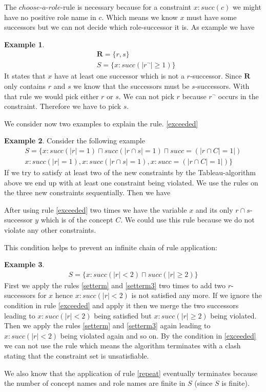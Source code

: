 \documentclass[a4paper,11pt]{scrartcl}
\theoremstyle{break}
\theoremstyle{definition}
\newtheorem{ex}{Example}
\begin{document}
The $choose$-$a$-$role$-rule is necessary because for a constraint $x:succ(c)$ we might have no positive role name in $c$. Which means we know $x$ must have some successors but we can not decide which role-successor it is. As example we have
\begin{ex}
\begin{align*}
&\mathbf{R}=\{r,s\}\\
&S=\{x:succ(|r^\neg|\geq 1)\}
\end{align*}
It states that $x$ have at least one successor which is not a $r$-successor. Since $\mathbf{R}$ only contains $r$ and $s$ we know that the successors must be $s$-successors. With that rule we would pick either $r$ or $s$. We can not pick $r$ because $r^\neg$ occurs in the constraint. Therefore we have to pick $s$.
\end{ex}
We consider now two examples to explain the rule. \ref{exceeded}
\begin{ex}
Consider the following example 
\begin{align*}
S=\{x:succ(|r|=1)\sqcap succ(|r\cap s|=1)\sqcap succ=(|r\cap C|=1|)\\
x:succ(|r|=1), x:succ(|r\cap s|=1), x:succ=(|r\cap C|=1|)
\}
\end{align*}
If we try to satisfy at least two of the new constraints by the Tableau-algorithm above we end up with at least one constraint being violated. We use the rules on the three new constraints sequentially. Then we have 
\begin{figure}[H]
\centering
{}
\end{figure}
After using rule \ref{exceeded} two times we have the variable $x$ and its only $r\cap s$-successor $y$ which is of the concept $C$. We could use this rule because we do not violate any other constraints. 
\end{ex}
This condition helps to prevent an infinite chain of rule application:
\begin{ex}
\begin{align*}
S=\{x:succ(|r|<2)\sqcap succ(|r|\geq 2)\}	
\end{align*}
First we apply the rules \ref{setterm} and \ref{setterm3} two times to add two $r$-successors for $x$ hence $x:succ(|r|<2)$ is not satisfied any more. If we ignore the condition in rule \ref{exceeded} and apply it then we merge the two successors leading to $x:succ(|r|<2)$ being satisfied but $x:succ(|r|\geq 2)$ being violated. Then we apply the rules \ref{setterm} and \ref{setterm3} again leading to $x:succ(|r|<2)$ being violated again and so on. By the condition in \ref{exceeded} we can not use the rule which means the algorithm terminates with a clash stating that the constraint set is unsatisfiable.
\end{ex}
We also know that the application of rule \ref{repeat} eventually terminates because the number of concept names and role names are finite in $S$ (since $S$ is finite).
\end{document}
